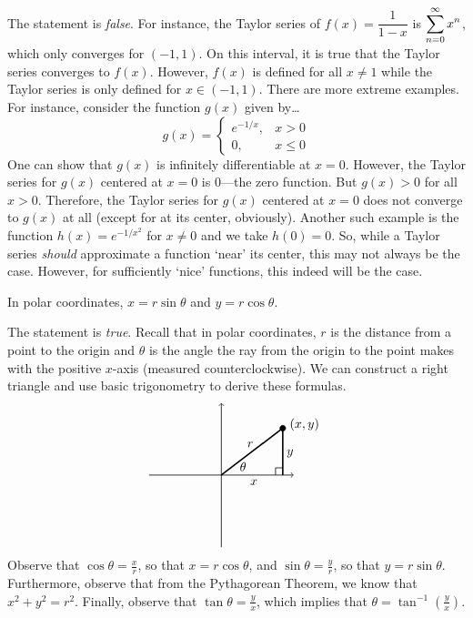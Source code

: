 \documentclass[11pt,letterpaper]{article}
\begin{document}
\sol The statement is \textit{false}. For instance, the Taylor series of $f(x)= \dfrac{1}{1 - x}$ is $\displaystyle\sum_{n=0}^\infty x^n$, which only converges for $(-1, 1)$. On this interval, it is true that the Taylor series converges to $f(x)$. However, $f(x)$ is defined for all $x \neq 1$ while the Taylor series is only defined for $x \in (-1, 1)$. There are more extreme examples. For instance, consider the function $g(x)$ given by\dots
	\[
	g(x)=
	\begin{cases}
	e^{-1/x}, & x > 0 \\
	0, & x \leq 0
	\end{cases}
	\]
One can show that $g(x)$ is infinitely differentiable at $x= 0$. However, the Taylor series for $g(x)$ centered at $x= 0$ is $0$---the zero function. But $g(x) > 0$ for all $x > 0$. Therefore, the Taylor series for $g(x)$ centered at $x= 0$ does not converge to $g(x)$ at all (except for at its center, obviously). Another such example is the function $h(x)= e^{-1/x^2}$ for $x \neq 0$ and we take $h(0)= 0$. So, while a Taylor series \textit{should} approximate a function `near' its center, this may not always be the case. However, for sufficiently `nice' functions, this indeed will be the case. \pvspace{1.3cm}



 In polar coordinates, $x= r \sin \theta$ and $y= r \cos \theta$. \pspace

\sol The statement is \textit{true}. Recall that in polar coordinates, $r$ is the distance from a point to the origin and $\theta$ is the angle the ray from the origin to the point makes with the positive $x$-axis (measured counterclockwise). We can construct a right triangle and use basic trigonometry to derive these formulas.
	\[
	\begin{tikzpicture}
	\draw[line width=0.02cm,->] (-2,0) -- (2,0);
	\draw[line width=0.02cm,->] (0,-2) -- (0,2);
	\draw[line width=0.02cm] (1.5,0) -- (1.5,0.2) -- (1.7,0.2);
	\draw[line width=0.04cm] (0,0) -- (1.7,1.3) -- (1.7,0);
	\draw[fill=black] (1.7,1.3) circle (0.08);
	\node at (2.3,1.4) {$(x, y)$};
	\node at (0.6,0.23) {$\theta$};
	\node at (0.8,0.85) {$r$};
	\node at (0.9,-0.2) {$x$};
	\node at (1.9,0.6) {$y$};
	\end{tikzpicture}
	\]
Observe that $\cos \theta= \frac{x}{r}$, so that $x= r \cos \theta$, and $\sin \theta= \frac{y}{r}$, so that $y= r \sin \theta$. Furthermore, observe that from the Pythagorean Theorem, we know that $x^2 + y^2= r^2$. Finally, observe that $\tan \theta= \frac{y}{x}$, which implies that $\theta= \tan^{-1} ( \frac{y}{x} )$.
\end{document}
